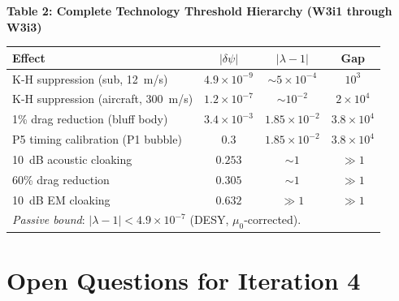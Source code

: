 \documentclass[11pt,twocolumn]{article}
\newcommand{\dpsi}{\delta\psi}
\newcommand{\lam}{\lambda}
\begin{document}
\begin{center}
\textbf{Table 2: Complete Technology Threshold Hierarchy (W3i1 through W3i3)}
\vspace{0.5em}

\begin{tabular}{@{}p{5.5cm}ccc@{}}
\toprule
\textbf{Effect} & $|\dpsi|$ & $|\lam-1|$ & Gap \\
\midrule
K-H suppression (sub, 12~m/s) & $4.9\times10^{-9}$ & $\sim5\times10^{-4}$ & $10^3$ \\
K-H suppression (aircraft, 300~m/s) & $1.2\times10^{-7}$ & $\sim10^{-2}$ & $2\times10^4$ \\
1\% drag reduction (bluff body) & $3.4\times10^{-3}$ & $1.85\times10^{-2}$ & $3.8\times10^4$ \\
P5 timing calibration (P1 bubble) & $0.3$ & $1.85\times10^{-2}$ & $3.8\times10^4$ \\
10~dB acoustic cloaking & $0.253$ & $\sim1$ & $\gg1$ \\
60\% drag reduction & $0.305$ & $\sim1$ & $\gg1$ \\
10~dB EM cloaking & $0.632$ & $\gg1$ & $\gg1$ \\
\midrule
\multicolumn{4}{l}{\textit{Passive bound}: $|\lam-1| < 4.9\times10^{-7}$ (DESY, $\mu_0$-corrected).} \\
\bottomrule
\end{tabular}
\end{center}

\section*{Open Questions for Iteration 4}
\end{document}
